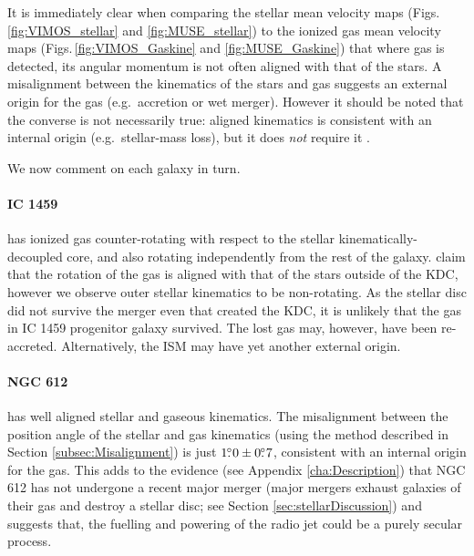 	It is immediately clear when comparing the stellar mean velocity maps (Figs.\,\ref{fig:VIMOS_stellar} and \ref{fig:MUSE_stellar}) to the ionized gas mean velocity maps (Figs.\,\ref{fig:VIMOS_Gaskine} and \ref{fig:MUSE_Gaskine}) that where gas is detected, its angular momentum is not often aligned with that of the stars. A misalignment between the kinematics of the stars and gas suggests an external origin for the gas (e.g.\ accretion or wet merger). However it should be noted that the converse is not necessarily true: aligned kinematics is consistent with an internal origin (e.g.\ stellar-mass loss), but it does \emph{not} require it \citep[e.g.][]{Davis2011a}. 

	We now comment on each galaxy in turn.

	\paragraph{IC 1459} has ionized gas counter-rotating with respect to the stellar kinematically-decoupled core, and also rotating independently from the rest of the galaxy. \citet{Franx1988} claim that the rotation of the gas is aligned with that of the stars outside of the KDC, however we observe outer stellar kinematics to be non-rotating. As the stellar disc did not survive the merger even that created the KDC, it is unlikely that the gas in IC 1459 progenitor galaxy survived. The lost gas may, however, have been re-accreted. Alternatively, the ISM may have yet another external origin. 

	\paragraph{NGC 612} has well aligned stellar and gaseous kinematics. The misalignment between the position angle of the stellar and gas kinematics (using the method described in Section \ref{subsec:Misalignment}) is just $1\hbox{$.\!\!^\circ$}0\pm0\hbox{$.\!\!^\circ$}7$, consistent with an internal origin for the gas. This adds to the evidence (see Appendix \ref{cha:Description}) that NGC 612 has not undergone a recent major merger (major mergers exhaust galaxies of their gas and destroy a stellar disc; see Section \ref{sec:stellarDiscussion}) and suggests that, the fuelling and powering of the radio jet could be a purely secular process. 


